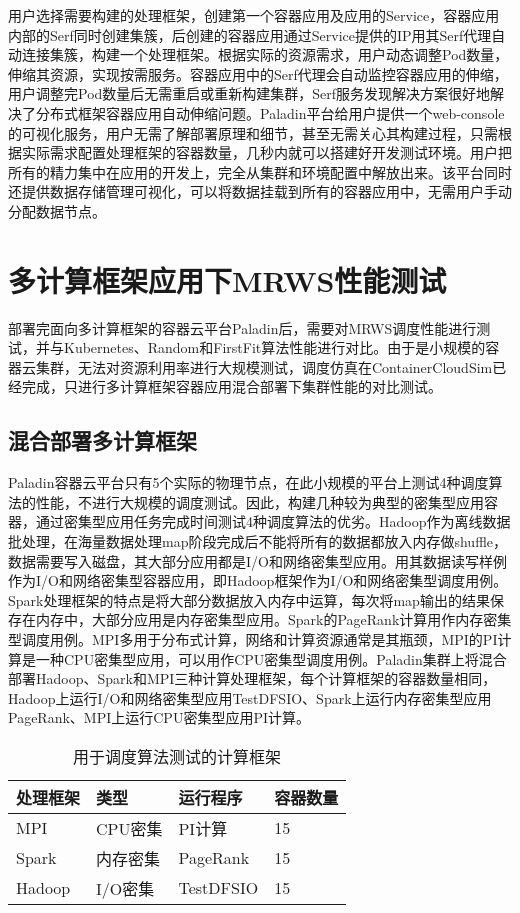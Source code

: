 用户选择需要构建的处理框架，创建第一个容器应用及应用的Service，容器应用内部的Serf同时创建集簇，后创建的容器应用通过Service提供的IP用其Serf代理自动连接集簇，构建一个处理框架。根据实际的资源需求，用户动态调整Pod数量，伸缩其资源，实现按需服务。容器应用中的Serf代理会自动监控容器应用的伸缩，用户调整完Pod数量后无需重启或重新构建集群，Serf服务发现解决方案很好地解决了分布式框架容器应用自动伸缩问题。Paladin平台给用户提供一个web-console的可视化服务，用户无需了解部署原理和细节，甚至无需关心其构建过程，只需根据实际需求配置处理框架的容器数量，几秒内就可以搭建好开发测试环境。用户把所有的精力集中在应用的开发上，完全从集群和环境配置中解放出来。该平台同时还提供数据存储管理可视化，可以将数据挂载到所有的容器应用中，无需用户手动分配数据节点。

\section{多计算框架应用下MRWS性能测试}
部署完面向多计算框架的容器云平台Paladin后，需要对MRWS调度性能进行测试，并与Kubernetes、Random和FirstFit算法性能进行对比。由于是小规模的容器云集群，无法对资源利用率进行大规模测试，调度仿真在ContainerCloudSim已经完成，只进行多计算框架容器应用混合部署下集群性能的对比测试。

\subsection{混合部署多计算框架}
Paladin容器云平台只有5个实际的物理节点，在此小规模的平台上测试4种调度算法的性能，不进行大规模的调度测试。因此，构建几种较为典型的密集型应用容器，通过密集型应用任务完成时间测试4种调度算法的优劣。Hadoop作为离线数据批处理，在海量数据处理map阶段完成后不能将所有的数据都放入内存做shuffle，数据需要写入磁盘，其大部分应用都是I/O和网络密集型应用。用其数据读写样例作为I/O和网络密集型容器应用，即Hadoop框架作为I/O和网络密集型调度用例。Spark处理框架的特点是将大部分数据放入内存中运算，每次将map输出的结果保存在内存中，大部分应用是内存密集型应用。Spark的PageRank计算用作内存密集型调度用例。MPI多用于分布式计算，网络和计算资源通常是其瓶颈，MPI的PI计算是一种CPU密集型应用，可以用作CPU密集型调度用例。Paladin集群上将混合部署Hadoop、Spark和MPI三种计算处理框架，每个计算框架的容器数量相同，Hadoop上运行I/O和网络密集型应用TestDFSIO、Spark上运行内存密集型应用PageRank、MPI上运行CPU密集型应用PI计算。
\begin{table}[H]
	\centering\dawu[1.3]
	\caption{用于调度算法测试的计算框架}
	\begin{tabular}{|p{2.5cm}<{\centering}|p{2.5cm}<{\centering}|p{2.5cm}<{\centering}|p{2.5cm}<{\centering}|} \hline
		处理框架 & 类型 & 运行程序 & 容器数量 \\ \hline
		MPI & CPU密集 & PI计算 & 15 \\ \hline
		Spark & 内存密集 & PageRank & 15  \\ \hline
		Hadoop & I/O密集 & TestDFSIO & 15  \\ \hline
	\end{tabular}
\end{table}


